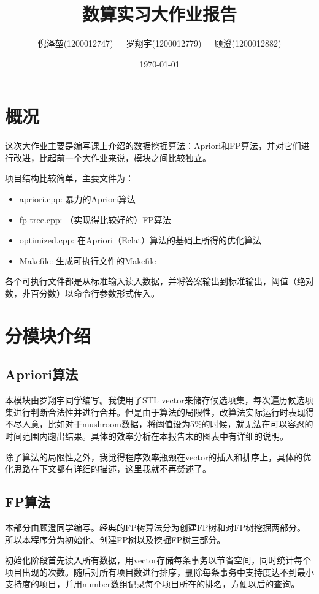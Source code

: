 \documentclass[a4paper,9pt]{article}
\title{\textbf{数算实习大作业报告}}
\author{\small{倪泽堃(1200012747)\ \ \ 罗翔宇(1200012779)\ \ \ 顾澄(1200012882)}}
\date{\today}
\begin{document}
\maketitle
\section{概况}
这次大作业主要是编写课上介绍的数据挖掘算法：Apriori和FP算法，并对它们进行改进，比起前一个大作业来说，模块之间比较独立。

项目结构比较简单，主要文件为：
\begin{itemize}
	\item{apriori.cpp:} 暴力的Apriori算法
	\item{fp-tree.cpp:} （实现得比较好的）FP算法
	\item{optimized.cpp:} 在Apriori（Eclat）算法的基础上所得的优化算法
	\item{Makefile:} 生成可执行文件的Makefile
\end{itemize}

各个可执行文件都是从标准输入读入数据，并将答案输出到标准输出，阈值（绝对数，非百分数）以命令行参数形式传入。

\section{分模块介绍}

\subsection{Apriori算法}
本模块由罗翔宇同学编写。我使用了STL vector来储存候选项集，每次遍历候选项集进行判断合法性并进行合并。但是由于算法的局限性，改算法实际运行时表现得不尽人意，比如对于mushroom数据，将阈值设为5\%的时候，就无法在可以容忍的时间范围内跑出结果。具体的效率分析在本报告末的图表中有详细的说明。

除了算法的局限性之外，我觉得程序效率瓶颈在vector的插入和排序上，具体的优化思路在下文都有详细的描述，这里我就不再赘述了。
\subsection{FP算法}
本部分由顾澄同学编写。经典的FP树算法分为创建FP树和对FP树挖掘两部分。所以本程序分为初始化、创建FP树以及挖掘FP树三部分。

初始化阶段首先读入所有数据，用vector存储每条事务以节省空间，同时统计每个项目出现的次数。随后对所有项目数进行排序，删除每条事务中支持度达不到最小支持度的项目，并用number数组记录每个项目所在的排名，方便以后的查询。
\end{document}

